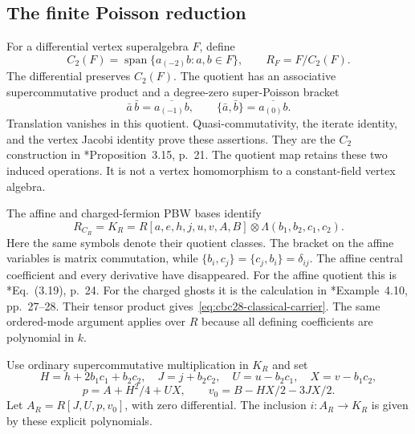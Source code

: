 \subsection{The finite Poisson reduction}

For a differential vertex superalgebra $F$, define
\[
 C_2(F)=\operatorname{span}\{a_{(-2)}b:a,b\in F\},\qquad
 R_F=F/C_2(F).
\]
The differential preserves $C_2(F)$.
The quotient has an associative supercommutative product and a degree-zero super-Poisson bracket
\[
 \bar a\,\bar b=\overline{a_{(-1)}b},\qquad
 \{\bar a,\bar b\}=\overline{a_{(0)}b}.
\]
Translation vanishes in this quotient.
Quasi-commutativity, the iterate identity, and the vertex Jacobi identity prove these assertions.
They are the $C_2$ construction in \cite{AffineDSArakawa026}*{Proposition~3.15, p.~21}.
The quotient map retains these two induced operations.
It is not a vertex homomorphism to a constant-field vertex algebra.

The affine and charged-fermion PBW bases identify
\begin{equation}\label{eq:cbc28-classical-carrier}
 R_{C_R}=K_R
 =R[a,e,h,j,u,v,A,B]\otimes\Lambda(b_1,b_2,c_1,c_2).
\end{equation}
Here the same symbols denote their quotient classes.
The bracket on the affine variables is matrix commutation, while
$\{b_i,c_j\}=\{c_j,b_i\}=\delta_{ij}$.
The affine central coefficient and every derivative have disappeared.
For the affine quotient this is \cite{AffineDSArakawa026}*{Eq.~(3.19), p.~24}.
For the charged ghosts it is the calculation in \cite{AffineDSArakawa026}*{Example~4.10, pp.~27--28}.
Their tensor product gives~\eqref{eq:cbc28-classical-carrier}.
The same ordered-mode argument applies over $R$ because all defining coefficients are polynomial in $k$.

Use ordinary supercommutative multiplication in $K_R$ and set
\[
 H=h+2b_1c_1+b_2c_2,\quad J=j+b_2c_2,\quad
 U=u-b_2c_1,\quad X=v-b_1c_2,
\]
\begin{equation}\label{eq:cbc28-finite-invariants}
 p=A+H^2/4+UX,\qquad v_0=B-HX/2-3JX/2.
\end{equation}
Let $A_R=R[J,U,p,v_0]$, with zero differential.
The inclusion $i:A_R\to K_R$ is given by these explicit polynomials.


